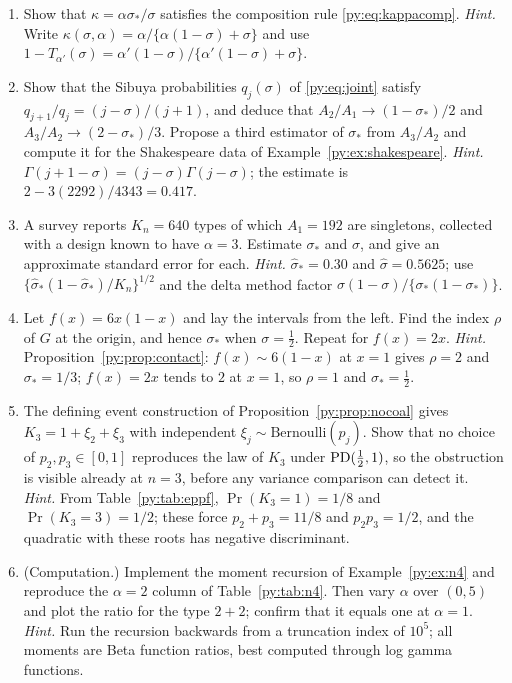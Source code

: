 \begin{enumerate}[label=\arabic*., leftmargin=*]
\item Show that $\kappa = \alpha\sigma_*/\sigma$ satisfies the composition rule
\eqref{py:eq:kappacomp}.
\emph{Hint.} Write $\kappa(\sigma,\alpha) = \alpha/\{\alpha(1-\sigma)+\sigma\}$ and use
$1-T_{\alpha'}(\sigma) = \alpha'(1-\sigma)/\{\alpha'(1-\sigma)+\sigma\}$.

\item Show that the Sibuya probabilities $q_j(\sigma)$ of \eqref{py:eq:joint} satisfy
$q_{j+1}/q_j = (j-\sigma)/(j+1)$, and deduce that $A_2/A_1 \to (1-\sigma_*)/2$ and
$A_3/A_2 \to (2-\sigma_*)/3$. Propose a third estimator of $\sigma_*$ from $A_3/A_2$ and compute it
for the Shakespeare data of Example~\ref{py:ex:shakespeare}.
\emph{Hint.} $\Gamma(j+1-\sigma) = (j-\sigma)\Gamma(j-\sigma)$; the estimate is
$2 - 3(2292)/4343 = 0.417$.

\item A survey reports $K_n = 640$ types of which $A_1 = 192$ are singletons, collected with a
design known to have $\alpha = 3$. Estimate $\sigma_*$ and $\sigma$, and give an approximate
standard error for each.
\emph{Hint.} $\hat\sigma_* = 0.30$ and $\hat\sigma = 0.5625$; use
$\{\hat\sigma_*(1-\hat\sigma_*)/K_n\}^{1/2}$ and the delta method factor
$\sigma(1-\sigma)/\{\sigma_*(1-\sigma_*)\}$.

\item Let $f(x) = 6x(1-x)$ and lay the intervals from the left. Find the index $\rho$ of $G$ at the
origin, and hence $\sigma_*$ when $\sigma = \tfrac12$. Repeat for $f(x) = 2x$.
\emph{Hint.} Proposition~\ref{py:prop:contact}: $f(x) \sim 6(1-x)$ at $x = 1$ gives $\rho = 2$ and
$\sigma_* = 1/3$; $f(x) = 2x$ tends to $2$ at $x = 1$, so $\rho = 1$ and $\sigma_* = \tfrac12$.

\item The defining event construction of Proposition~\ref{py:prop:nocoal} gives
$K_3 = 1 + \xi_2 + \xi_3$ with independent $\xi_j \sim \mathrm{Bernoulli}(p_j)$. Show that no choice
of $p_2, p_3 \in [0,1]$ reproduces the law of $K_3$ under $\mathrm{PD}(\tfrac12,1)$, so the obstruction is
visible already at $n = 3$, before any variance comparison can detect it.
\emph{Hint.} From Table~\ref{py:tab:eppf}, $\Pr(K_3 = 1) = 1/8$ and $\Pr(K_3 = 3) = 1/2$; these force
$p_2+p_3 = 11/8$ and $p_2p_3 = 1/2$, and the quadratic with these roots has negative discriminant.

\item (Computation.) Implement the moment recursion of Example~\ref{py:ex:n4} and reproduce the
$\alpha = 2$ column of Table~\ref{py:tab:n4}. Then vary $\alpha$ over $(0,5)$ and plot the ratio
for the type $2{+}2$; confirm that it equals one at $\alpha = 1$.
\emph{Hint.} Run the recursion backwards from a truncation index of $10^{5}$; all moments are Beta
function ratios, best computed through log gamma functions.


\end{enumerate}
